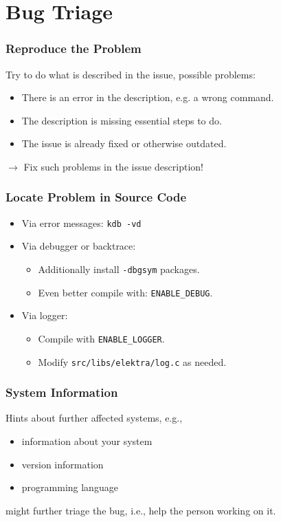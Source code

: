 \section{Bug Triage}

\begin{frame}
	\frametitle{Reproduce the Problem}
	Try to do what is described in the issue, possible problems:
	\begin{itemize}
		\item There is an error in the description, e.g. a wrong command.
		\item The description is missing essential steps to do.
		\item The issue is already fixed or otherwise outdated.
	\end{itemize}
	\vspace{1cm}
	$\rightarrow$ Fix such problems in the issue description!
\end{frame}

\begin{frame}[fragile]
	\frametitle{Locate Problem in Source Code}
	\begin{itemize}
		\item Via error messages: \verb+kdb -vd+

		\item Via debugger or backtrace:
		\begin{itemize}
			\item Additionally install \verb+-dbgsym+ packages.
			\item Even better compile with: \verb+ENABLE_DEBUG+.
		\end{itemize}

		\item Via logger:
		\begin{itemize}
			\item Compile with \verb+ENABLE_LOGGER+.
			\item Modify \verb+src/libs/elektra/log.c+ as needed.
		\end{itemize}
	\end{itemize}
\end{frame}

\begin{frame}
	\frametitle{System Information}
	Hints about further affected systems, e.g.,
	\begin{itemize}
		\item information about your system
		\item version information
		\item programming language
	\end{itemize}
	might further triage the bug, i.e., help the person working on it.
\end{frame}

